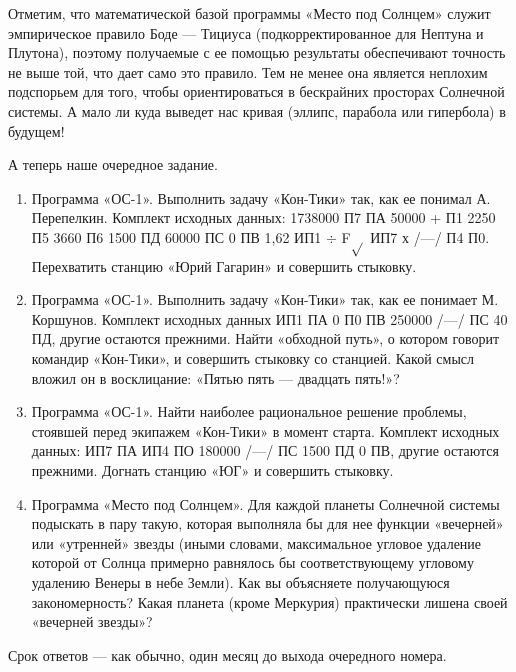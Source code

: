 \documentclass[11pt,a4paper,oneside]{article}
\begin{document}
Отметим, что математической базой программы «Место под Солнцем» служит эмпирическое правило Боде — Тициуса (подкорректированное для Нептуна и Плутона), поэтому получаемые с ее помощью результаты обеспечивают точность не выше той, что дает само это правило. Тем не менее она является неплохим подспорьем для того, чтобы ориентироваться в бескрайних просторах Солнечной системы. А мало ли куда выведет нас кривая (эллипс, парабола или гипербола) в будущем!

А теперь наше очередное задание.

\begin{enumerate}
\item Программа «ОС-1». Выполнить задачу «Кон-Тики» так, как ее понимал А. Перепелкин. Комплект исходных данных: 1738000 П7 ПА 50000 + П1 2250 П5 3660 П6 1500 ПД 60000 ПС 0 ПВ 1,62 ИП1 $\div$ F$\sqrt{}$ ИП7 х /—/ П4 П0. Перехватить станцию «Юрий Гагарин» и совершить стыковку.
\item Программа «ОС-1». Выполнить задачу «Кон-Тики» так, как ее понимает М. Коршунов. Комплект исходных данных ИП1 ПА 0 П0 ПВ 250000 /—/ ПС 40 ПД, другие остаются прежними. Найти «обходной путь», о котором говорит командир «Кон-Тики», и совершить стыковку со станцией. Какой смысл вложил он в восклицание: «Пятью пять — двадцать пять!»?
\item Программа «ОС-1». Найти наиболее рациональное решение проблемы, стоявшей перед экипажем «Кон-Тики» в момент старта. Комплект исходных данных: ИП7 ПА ИП4 ПО 180000 /—/ ПС 1500 ПД 0 ПВ, другие остаются прежними. Догнать станцию «ЮГ» и совершить стыковку.
\item Программа «Место под Солнцем». Для каждой планеты Солнечной системы подыскать в пару такую, которая выполняла бы для нее функции «вечерней» или «утренней» звезды (иными словами, максимальное угловое удаление которой от Солнца примерно равнялось бы соответствующему угловому удалению Венеры в небе Земли). Как вы объясняете получающуюся закономерность? Какая планета (кроме Меркурия) практически лишена своей «вечерней звезды»?
\end{enumerate}

Срок ответов — как обычно, один месяц до выхода очередного номера.
\end{document}

